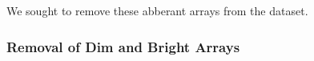 \documentclass{bioinfo}
\begin{document}
\begin{methods}
We sought to remove these abberant arrays from the dataset.


\subsubsection{Removal of Dim and Bright Arrays}\label{dimbright}


\end{methods}
\end{document}
